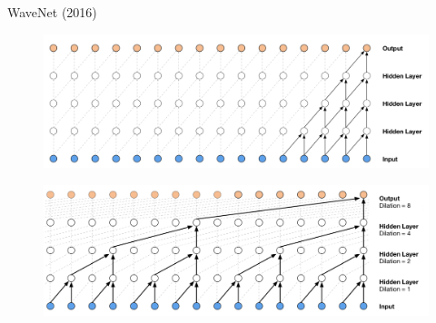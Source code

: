 \begin{frame}{WaveNet (2016)}
\begin{figure}
    \centering
    \includegraphics[width=0.9\linewidth]{figs/wavenet1.png}
\end{figure}

\begin{figure}
    \centering
    \includegraphics[width=0.9\linewidth]{figs/wavenet2.png}
\end{figure}
\end{frame}

